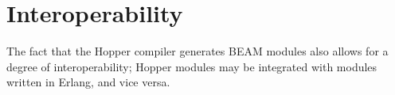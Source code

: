 \section{Interoperability}

The fact that the Hopper compiler generates BEAM modules also allows for a degree of interoperability; Hopper modules may be integrated with modules written in Erlang, and vice versa. 